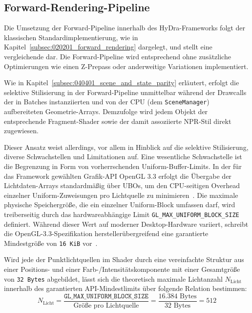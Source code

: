 \subsection{Forward-Rendering-Pipeline}
\label{subsec:040201_forward_pipeline}

Die Umsetzung der Forward-Pipeline innerhalb des \ac{HyDra}-Frameworks folgt der klassischen
Standardimplementierung, wie in Kapitel~\ref{subsec:020201_forward_rendering} dargelegt, und stellt eine vergleichende
 dar.
Die Forward-Pipeline wird entsprechend ohne zusätzliche Optimierungen wie einen Z-Prepass oder anderweitige Variationen
implementiert.

Wie in Kapitel~\ref{subsec:040401_scene_and_state_parity} erläutert, erfolgt die selektive Stilisierung in der
Forward-Pipeline unmittelbar während der Drawcalls der in Batches instanziierten und von der \ac{CPU}
(dem \texttt{SceneManager}) aufbereiteten Geometrie-Arrays.
Demzufolge wird jedem Objekt der entsprechende Fragment-Shader sowie der damit assoziierte \ac{NPR}-Stil direkt
zugewiesen.

Dieser Ansatz weist allerdings, vor allem in Hinblick auf die selektive Stilisierung, diverse Schwachstellen und
Limitationen auf.
Eine wesentliche Schwachstelle ist die Begrenzung in Form von vorherrschenden Uniform-Buffer-Limits.
In der für das Framework gewählten Grafik-\ac{API} OpenGL 3.3 erfolgt die Übergabe der Lichtdaten-Arrays standardmäßig
über \acp{UBO}, um den \ac{CPU}-seitigen Overhead einzelner Uniform-Zuweisungen pro Lichtquelle zu
minimieren~\parencite[vgl.][S.~798]{akenine-mollerRealtimeRendering2019}.
Die maximale physische Speichergröße, die ein einzelner Uniform-Block umfassen darf, wird treiberseitig durch das
hardwareabhängige Limit \texttt{GL\_MAX\_UNIFORM\_BLOCK\_SIZE} definiert.
Während dieser Wert auf moderner Desktop-Hardware variiert, schreibt die OpenGL-3.3-Spezifikation herstellerübergreifend
eine garantierte Mindestgröße von \texttt{16 KiB} vor~\parencite[vgl.][S.~321, Tab.~6.45]{OpenGL33Core2010}.

Wird jede der Punktlichtquellen im Shader durch eine vereinfachte Struktur aus einer Positions- und einer
Farb-/Intensitätskomponente mit einer Gesamtgröße von \texttt{32 Bytes} abgebildet, lässt sich die theoretisch maximale
Lichtanzahl $N_{\text{Licht}}$ innerhalb des garantierten \ac{API}-Mindestlimits über folgende Relation bestimmen:
\begin{equation}
    N_{\text{Licht}} = \frac{\texttt{GL\_MAX\_UNIFORM\_BLOCK\_SIZE}}{\text{Größe pro Lichtquelle}} =
    \frac{16.384\text{ Bytes}}{32\text{ Bytes}} = 512
    \label{eq:ubo-limits}
\end{equation}

